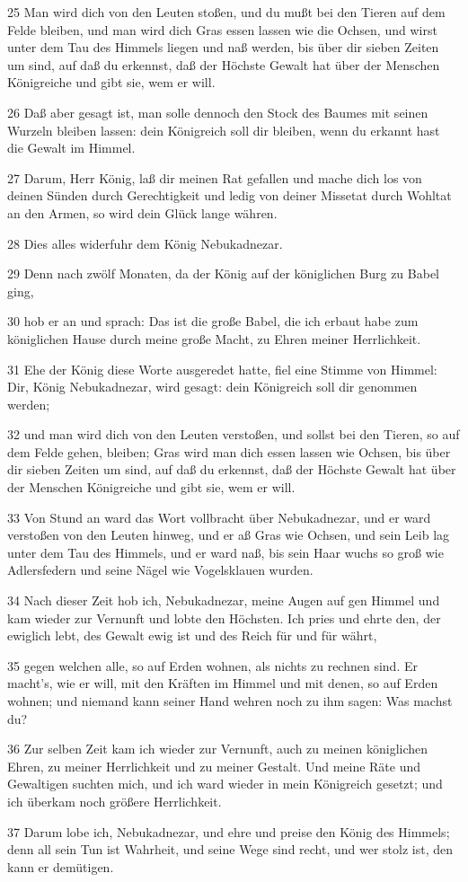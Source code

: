 \par 25 Man wird dich von den Leuten stoßen, und du mußt bei den Tieren auf dem Felde bleiben, und man wird dich Gras essen lassen wie die Ochsen, und wirst unter dem Tau des Himmels liegen und naß werden, bis über dir sieben Zeiten um sind, auf daß du erkennst, daß der Höchste Gewalt hat über der Menschen Königreiche und gibt sie, wem er will.
\par 26 Daß aber gesagt ist, man solle dennoch den Stock des Baumes mit seinen Wurzeln bleiben lassen: dein Königreich soll dir bleiben, wenn du erkannt hast die Gewalt im Himmel.
\par 27 Darum, Herr König, laß dir meinen Rat gefallen und mache dich los von deinen Sünden durch Gerechtigkeit und ledig von deiner Missetat durch Wohltat an den Armen, so wird dein Glück lange währen.
\par 28 Dies alles widerfuhr dem König Nebukadnezar.
\par 29 Denn nach zwölf Monaten, da der König auf der königlichen Burg zu Babel ging,
\par 30 hob er an und sprach: Das ist die große Babel, die ich erbaut habe zum königlichen Hause durch meine große Macht, zu Ehren meiner Herrlichkeit.
\par 31 Ehe der König diese Worte ausgeredet hatte, fiel eine Stimme von Himmel: Dir, König Nebukadnezar, wird gesagt: dein Königreich soll dir genommen werden;
\par 32 und man wird dich von den Leuten verstoßen, und sollst bei den Tieren, so auf dem Felde gehen, bleiben; Gras wird man dich essen lassen wie Ochsen, bis über dir sieben Zeiten um sind, auf daß du erkennst, daß der Höchste Gewalt hat über der Menschen Königreiche und gibt sie, wem er will.
\par 33 Von Stund an ward das Wort vollbracht über Nebukadnezar, und er ward verstoßen von den Leuten hinweg, und er aß Gras wie Ochsen, und sein Leib lag unter dem Tau des Himmels, und er ward naß, bis sein Haar wuchs so groß wie Adlersfedern und seine Nägel wie Vogelsklauen wurden.
\par 34 Nach dieser Zeit hob ich, Nebukadnezar, meine Augen auf gen Himmel und kam wieder zur Vernunft und lobte den Höchsten. Ich pries und ehrte den, der ewiglich lebt, des Gewalt ewig ist und des Reich für und für währt,
\par 35 gegen welchen alle, so auf Erden wohnen, als nichts zu rechnen sind. Er macht's, wie er will, mit den Kräften im Himmel und mit denen, so auf Erden wohnen; und niemand kann seiner Hand wehren noch zu ihm sagen: Was machst du?
\par 36 Zur selben Zeit kam ich wieder zur Vernunft, auch zu meinen königlichen Ehren, zu meiner Herrlichkeit und zu meiner Gestalt. Und meine Räte und Gewaltigen suchten mich, und ich ward wieder in mein Königreich gesetzt; und ich überkam noch größere Herrlichkeit.
\par 37 Darum lobe ich, Nebukadnezar, und ehre und preise den König des Himmels; denn all sein Tun ist Wahrheit, und seine Wege sind recht, und wer stolz ist, den kann er demütigen.


